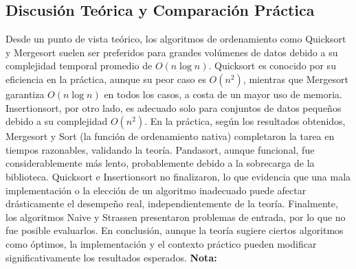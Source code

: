 \subsection*{Discusión Teórica y Comparación Práctica}

Desde un punto de vista teórico, los algoritmos de ordenamiento como Quicksort y Mergesort suelen ser preferidos para grandes volúmenes de datos debido a su complejidad temporal promedio de \(O(n \log n)\).
Quicksort es conocido por su eficiencia en la práctica, aunque su peor caso es \(O(n^2)\), mientras que Mergesort garantiza \(O(n \log n)\) en todos los casos, a costa de un mayor uso de memoria. Insertionsort, por otro lado, es adecuado solo para conjuntos de datos pequeños debido a su complejidad \(O(n^2)\).
En la práctica, según los resultados obtenidos, Mergesort y Sort (la función de ordenamiento nativa) completaron la tarea en tiempos razonables, validando la teoría. Pandasort, aunque funcional, fue considerablemente más lento, probablemente debido a la sobrecarga de la biblioteca.
Quicksort e Insertionsort no finalizaron, lo que evidencia que una mala implementación o la elección de un algoritmo inadecuado puede afectar drásticamente el desempeño real, independientemente de la teoría. Finalmente, los algoritmos Naive y Strassen presentaron problemas de entrada, por lo que no fue posible evaluarlos.
En conclusión, aunque la teoría sugiere ciertos algoritmos como óptimos, la implementación y el contexto práctico pueden modificar significativamente los resultados esperados.
\noindent
\textbf{Nota:} 